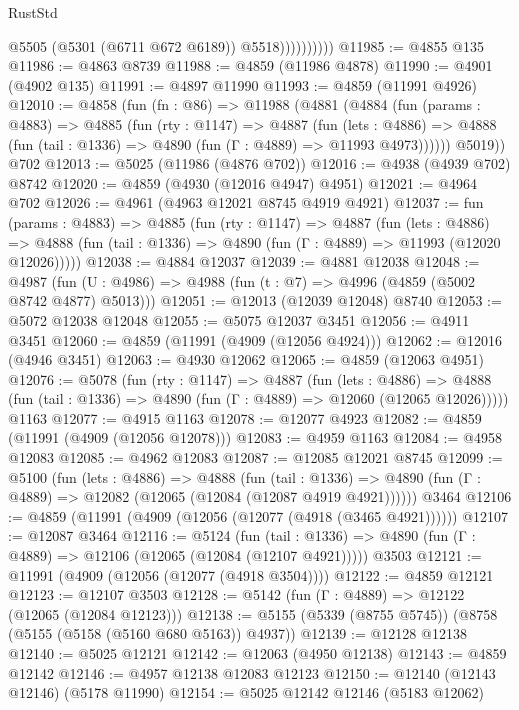 \begin{lexlean}{RustStd}
\begin{coremodule}
                        @5505
                        (@5301 (@6711 @672 @6189))
                        @5518))))))))))
@11985 := @4855 @135
@11986 := @4863 @8739
@11988 := @4859 (@11986 @4878)
@11990 := @4901 (@4902 @135)
@11991 := @4897 @11990
@11993 := @4859 (@11991 @4926)
@12010 := @4858
    (fun (fn : @86) =>
    @11988
      (@4881
        (@4884
          (fun (params : @4883) =>
          @4885
            (fun (rty : @1147) =>
            @4887
              (fun (lets : @4886) =>
              @4888 (fun (tail : @1336) => @4890 (fun (Γ : @4889) => @11993 @4973))))))
        @5019))
    @702
@12013 := @5025 (@11986 (@4876 @702))
@12016 := @4938 (@4939 @702) @8742
@12020 := @4859 (@4930 (@12016 @4947) @4951)
@12021 := @4964 @702
@12026 := @4961 (@4963 @12021 @8745 @4919 @4921)
@12037 := fun (params : @4883) =>
  @4885
    (fun (rty : @1147) =>
    @4887
      (fun (lets : @4886) =>
      @4888 (fun (tail : @1336) => @4890 (fun (Γ : @4889) => @11993 (@12020 @12026)))))
@12038 := @4884 @12037
@12039 := @4881 @12038
@12048 := @4987 (fun (U : @4986) => @4988 (fun (t : @7) => @4996 (@4859 (@5002 @8742 @4877) @5013)))
@12051 := @12013 (@12039 @12048) @8740
@12053 := @5072 @12038 @12048
@12055 := @5075 @12037 @3451
@12056 := @4911 @3451
@12060 := @4859 (@11991 (@4909 (@12056 @4924)))
@12062 := @12016 (@4946 @3451)
@12063 := @4930 @12062
@12065 := @4859 (@12063 @4951)
@12076 := @5078
    (fun (rty : @1147) =>
    @4887
      (fun (lets : @4886) =>
      @4888 (fun (tail : @1336) => @4890 (fun (Γ : @4889) => @12060 (@12065 @12026)))))
    @1163
@12077 := @4915 @1163
@12078 := @12077 @4923
@12082 := @4859 (@11991 (@4909 (@12056 @12078)))
@12083 := @4959 @1163
@12084 := @4958 @12083
@12085 := @4962 @12083
@12087 := @12085 @12021 @8745
@12099 := @5100
    (fun (lets : @4886) =>
    @4888
      (fun (tail : @1336) =>
      @4890 (fun (Γ : @4889) => @12082 (@12065 (@12084 (@12087 @4919 @4921))))))
    @3464
@12106 := @4859 (@11991 (@4909 (@12056 (@12077 (@4918 (@3465 @4921))))))
@12107 := @12087 @3464
@12116 := @5124
    (fun (tail : @1336) => @4890 (fun (Γ : @4889) => @12106 (@12065 (@12084 (@12107 @4921)))))
    @3503
@12121 := @11991 (@4909 (@12056 (@12077 (@4918 @3504))))
@12122 := @4859 @12121
@12123 := @12107 @3503
@12128 := @5142 (fun (Γ : @4889) => @12122 (@12065 (@12084 @12123)))
@12138 := @5155 (@5339 (@8755 @5745)) (@8758 (@5155 (@5158 (@5160 @680 @5163)) @4937))
@12139 := @12128 @12138
@12140 := @5025 @12121
@12142 := @12063 (@4950 @12138)
@12143 := @4859 @12142
@12146 := @4957 @12138 @12083 @12123
@12150 := @12140 (@12143 @12146) (@5178 @11990)
@12154 := @5025 @12142 @12146 (@5183 @12062)

\end{coremodule}
\end{lexlean}
